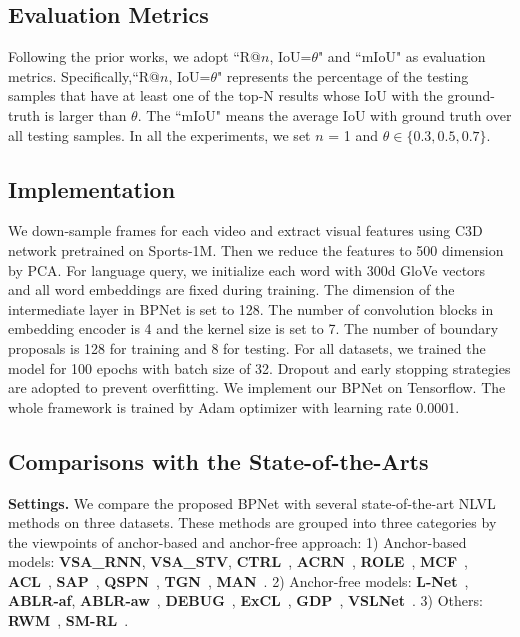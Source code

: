 \documentclass[letterpaper]{article} %
\begin{document}
\subsection{Evaluation Metrics}\label{Metrics}
Following the prior works, we adopt ``R@$n$, IoU=$\theta$" and ``mIoU" as evaluation metrics. 
Specifically,``R@$n$, IoU=$\theta$" represents the percentage of the testing samples that 
have at least one of the top-N results whose IoU with the ground-truth is larger than $\theta$. 
The ``mIoU" means the average IoU with ground truth over all testing samples. 
In all the experiments, we set $n$ = 1 and $\theta\in \{0.3, 0.5, 0.7\}$. 

\subsection{Implementation}\label{Implementation}
We down-sample frames for each video and extract visual features 
using C3D~\cite{DBLP:conf/iccv/TranBFTP15} network pretrained on Sports-1M. Then we reduce the features 
to 500 dimension by PCA. 
For language query, we initialize each word with 300d GloVe vectors and all word embeddings are fixed during training.
The dimension of the intermediate layer in BPNet is set to 128. 
The number of convolution blocks in embedding encoder is 4 and the kernel size is set to 7. 
The number of boundary proposals is 128 for training and 8 for testing. 
For all datasets, we trained the model for 100 epochs with 
batch size of 32. 
Dropout and early stopping strategies are adopted to prevent overfitting. 
We implement our BPNet on Tensorflow. 
The whole framework is trained by Adam optimizer with learning rate 0.0001. 

\subsection{Comparisons with the State-of-the-Arts}\label{Comparison}
\noindent\textbf{Settings.} We compare the proposed BPNet with several state-of-the-art NLVL methods on three datasets. These methods are grouped into three categories by the viewpoints of anchor-based and anchor-free approach: 
 1) Anchor-based models: 
\textbf{VSA\_RNN}, \textbf{VSA\_STV}, \textbf{CTRL}~\cite{DBLP:conf/iccv/GaoSYN17}, \textbf{ACRN}~\cite{DBLP:conf/sigir/LiuWN0CC18}, \textbf{ROLE}~\cite{DBLP:conf/mm/LiuWN0CC18}, \textbf{MCF}~\cite{DBLP:conf/ijcai/WuH18}, \textbf{ACL}~\cite{DBLP:conf/wacv/GeGCN19}, \textbf{SAP}~\cite{DBLP:conf/aaai/ChenJ19a}, 
\textbf{QSPN}~\cite{DBLP:conf/aaai/Xu0PSSS19}, 
\textbf{TGN}~\cite{ChenCMJC18},
\textbf{MAN}~\cite{DBLP:conf/cvpr/ZhangDWWD19}. 
2) Anchor-free models:
\textbf{L-Net}~\cite{DBLP:conf/aaai/Chen0CJL19}, \textbf{ABLR-af}, \textbf{ABLR-aw}~\cite{DBLP:conf/aaai/YuanM019}, \textbf{DEBUG}~\cite{LuCTLX19},
\textbf{ExCL}~\cite{DBLP:conf/naacl/GhoshAPH19},
\textbf{GDP}~\cite{DBLP:conf/aaai/ChenLTXZTL20}, \textbf{VSLNet}~\cite{DBLP:conf/acl/ZhangSJZ20}. 
3) Others:
\textbf{RWM}~\cite{DBLP:conf/aaai/HeZHLLW19}, \textbf{SM-RL}~\cite{DBLP:conf/cvpr/WangHW19}.
\end{document}
